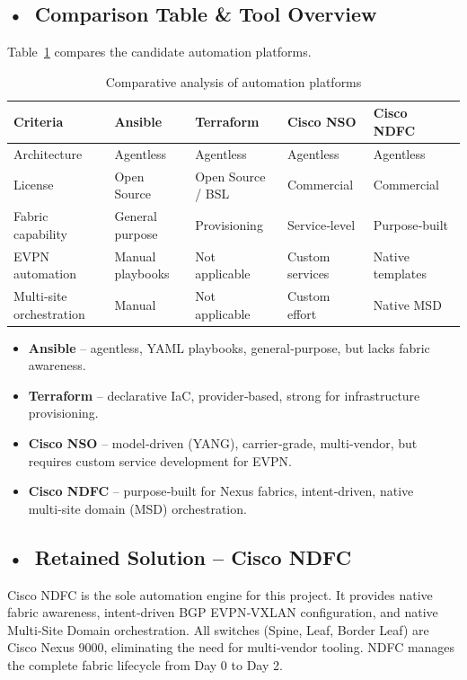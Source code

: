 \subsection*{\mbox{•}~Comparison Table \& Tool Overview}
Table~\ref{tab:automation-comparison} compares the candidate automation platforms.

\begin{table}[!htbp]
\centering
\small
\begin{tabularx}{\textwidth}{@{} >{\raggedright\arraybackslash}p{2.5cm} X X X X @{}}
\toprule
\textbf{Criteria} & \textbf{Ansible} & \textbf{Terraform} & \textbf{Cisco NSO} & \textbf{Cisco NDFC} \\
\midrule
Architecture & Agentless & Agentless & Agentless & Agentless \\
License & Open Source & Open Source / BSL & Commercial & Commercial \\
Fabric capability & General purpose & Provisioning & Service‑level & Purpose‑built \\
EVPN automation & Manual playbooks & Not applicable & Custom services & Native templates \\
Multi‑site orchestration & Manual & Not applicable & Custom effort & Native MSD \\
\bottomrule
\end{tabularx}
\caption{Comparative analysis of automation platforms}
\label{tab:automation-comparison}
\end{table}

\begin{itemize}
    \item \textbf{Ansible} – agentless, YAML playbooks, general‑purpose, but lacks fabric awareness.
    \item \textbf{Terraform} – declarative IaC, provider‑based, strong for infrastructure provisioning.
    \item \textbf{Cisco NSO} – model‑driven (YANG), carrier‑grade, multi‑vendor, but requires custom service development for EVPN.
    \item \textbf{Cisco NDFC} – purpose‑built for Nexus fabrics, intent‑driven, native multi‑site domain (MSD) orchestration.
\end{itemize}

\subsection*{\mbox{•}~Retained Solution – Cisco NDFC}
Cisco NDFC is the sole automation engine for this project. It provides native fabric awareness, intent‑driven BGP EVPN‑VXLAN configuration, and native Multi‑Site Domain orchestration. All switches (Spine, Leaf, Border Leaf) are Cisco Nexus 9000, eliminating the need for multi‑vendor tooling. NDFC manages the complete fabric lifecycle from Day 0 to Day 2.


